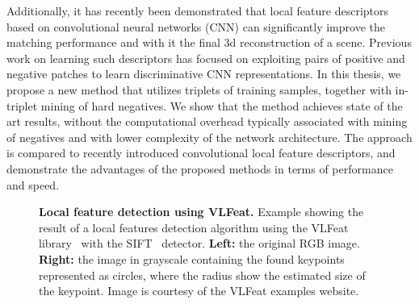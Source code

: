 Additionally, it has recently been demonstrated that local feature descriptors based on convolutional neural networks (CNN) can significantly improve the matching performance and with it the final 3d reconstruction of a scene. Previous work on learning such descriptors has focused on exploiting pairs of positive and negative patches to learn discriminative CNN representations. In this thesis, we propose a new method that utilizes triplets of training samples, together with in-triplet mining of hard negatives. We show that the method achieves state of the art results, without the computational overhead typically associated with mining of negatives and with lower complexity of the network architecture. The approach is compared to recently introduced convolutional local feature descriptors, and demonstrate the advantages of the proposed methods in terms of performance and speed.

\begin{figure}
    \centering
    \qquad
    \caption[Local feature detection using VLFeat]{\textbf{Local feature detection using VLFeat.} Example showing the result of a local features detection algorithm using the VLFeat library~\cite{vedaldi08vlfeat} with the SIFT~\cite{SIFT} detector. \textbf{Left:} the original RGB image. \textbf{Right:} the image in grayscale containing the found keypoints represented as circles, where the radius show the estimated size of the keypoint. Image is courtesy of the VLFeat examples website.}
    \label{fig:feature_detection_example}
\end{figure}

